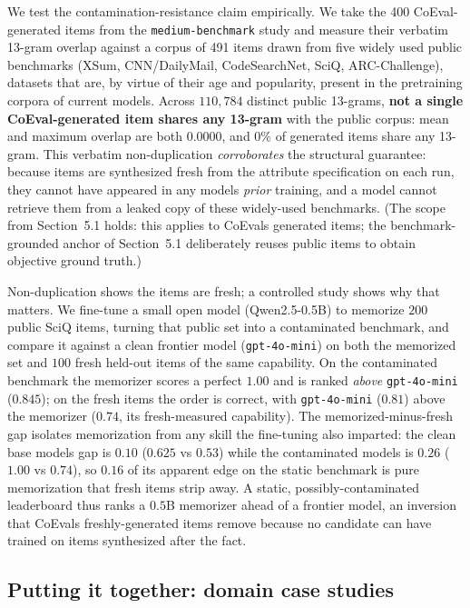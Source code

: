 \documentclass[11pt,a4paper]{article}
\begin{document}
We test the contamination-resistance claim empirically. We take the 400 CoEval-generated items from the
\texttt{medium-benchmark} study and measure their verbatim 13-gram overlap against a corpus of 491 items drawn
from five widely used public benchmarks (XSum, CNN/DailyMail, CodeSearchNet, SciQ, ARC-Challenge), datasets that
are, by virtue of their age and popularity, present in the pretraining corpora of current models. Across
\(110{,}784\) distinct public 13-grams, \textbf{not a single CoEval-generated item shares any 13-gram} with the
public corpus: mean and maximum overlap are both \(0.0000\), and \(0\%\) of generated items share any 13-gram. This
verbatim non-duplication \emph{corroborates} the structural guarantee: because items are synthesized fresh from the
attribute specification on each run, they cannot have appeared in any model\textquotesingle s \emph{prior} training, and a model
cannot retrieve them from a leaked copy of these widely-used benchmarks. (The scope from Section~5.1 holds: this
applies to CoEval\textquotesingle s generated items; the benchmark-grounded anchor of Section~5.1 deliberately reuses public items
to obtain objective ground truth.)

Non-duplication shows the items are fresh; a controlled study shows why that matters. We fine-tune a small open model
(Qwen2.5-0.5B) to memorize \(200\) public SciQ items, turning that public set into a contaminated benchmark, and compare
it against a clean frontier model (\texttt{gpt-4o-mini}) on both the memorized set and \(100\) fresh held-out items
of the same capability. On the contaminated benchmark the memorizer scores a perfect \(1.00\) and is ranked
\emph{above} \texttt{gpt-4o-mini} (\(0.845\)); on the fresh items the order is correct, with
\texttt{gpt-4o-mini} (\(0.81\)) above the memorizer (\(0.74\), its fresh-measured capability). The
memorized-minus-fresh gap isolates memorization from any skill the fine-tuning also imparted: the clean base model\textquotesingle s
gap is \(0.10\) (\(0.625\) vs \(0.53\)) while the contaminated model\textquotesingle s is \(0.26\) (\(1.00\) vs \(0.74\)), so \(0.16\) of its
apparent edge on the static benchmark is pure memorization that fresh items strip away. A static, possibly-contaminated
leaderboard thus ranks a \(0.5\)B memorizer ahead of a frontier model, an inversion that CoEval\textquotesingle s freshly-generated
items remove because no candidate can have trained on items synthesized after the fact.

\subsection{Putting it together: domain case studies}\label{putting-it-together-domain-case-studies}
\end{document}
